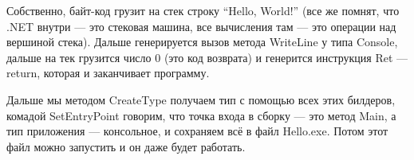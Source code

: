 \documentclass[a5paper]{article}
\begin{document}
Собственно, байт-код грузит на стек строку ``Hello, World!'' (все же помнят, что .NET внутри --- это стековая машина, все вычисления там --- это операции над вершиной стека). Дальше генерируется вызов метода WriteLine у типа Console, дальше на тек грузится число 0 (это код возврата) и генерится инструкция Ret --- return, которая и заканчивает программу. 

Дальше мы методом CreateType получаем тип с помощью всех этих билдеров, комадой SetEntryPoint говорим, что точка входа в сборку --- это метод Main, а тип приложения --- консольное, и сохраняем всё в файл Hello.exe. Потом этот файл можно запустить и он даже будет работать.
\end{document}
